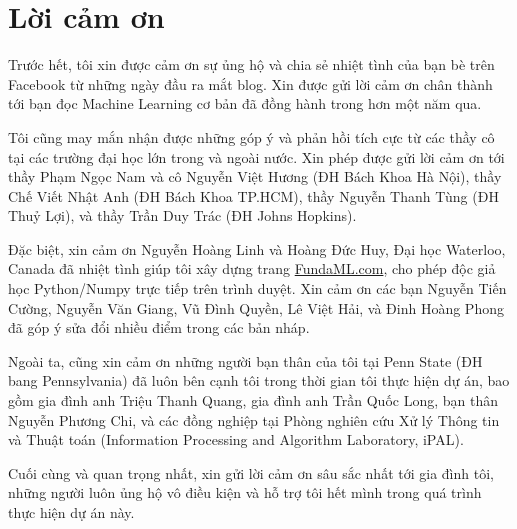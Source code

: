 



\section{Lời cảm ơn}
Trước hết, tôi xin được cảm ơn sự ủng hộ và chia sẻ nhiệt tình của bạn bè trên  Facebook từ những ngày đầu ra mắt blog. Xin được gửi lời cảm ơn chân thành tới bạn đọc Machine Learning cơ bản đã đồng hành trong hơn một năm qua.

Tôi cũng may mắn nhận được những góp ý và phản hồi tích cực từ các thầy cô
tại các trường đại học lớn trong và ngoài nước. Xin phép được gửi lời cảm ơn
tới thầy Phạm Ngọc Nam và cô Nguyễn Việt Hương (ĐH Bách Khoa Hà Nội), thầy Chế
Viết Nhật Anh (ĐH Bách Khoa TP.HCM), thầy Nguyễn Thanh Tùng (ĐH Thuỷ Lợi),
và thầy Trần Duy Trác (ĐH Johns Hopkins).

Đặc biệt, xin cảm ơn Nguyễn Hoàng Linh và Hoàng Đức Huy, Đại học Waterloo,
Canada đã nhiệt tình giúp tôi xây dựng trang \url{FundaML.com}, cho phép độc giả
học Python/Numpy trực tiếp trên trình duyệt. Xin cảm ơn các bạn Nguyễn
Tiến Cường, Nguyễn Văn Giang, Vũ Đình Quyền, Lê Việt Hải, và Đinh Hoàng Phong đã
góp ý sửa đổi nhiều điểm trong các bản nháp.

Ngoài ta, cũng xin cảm ơn những người bạn thân của tôi tại Penn State
(ĐH bang Pennsylvania) đã luôn bên cạnh tôi trong thời gian tôi thực hiện dự án,
bao gồm gia đình anh Triệu Thanh Quang, gia đình anh Trần Quốc Long, bạn thân
Nguyễn Phương Chi, và các đồng nghiệp tại Phòng nghiên cứu Xử lý Thông tin và
Thuật toán (Information Processing and Algorithm Laboratory, iPAL).

Cuối cùng và quan trọng nhất, xin gửi lời cảm ơn sâu sắc nhất tới gia đình tôi,
những người luôn ủng hộ vô điều kiện và hỗ trợ tôi hết mình trong quá trình thực
hiện dự án này.





